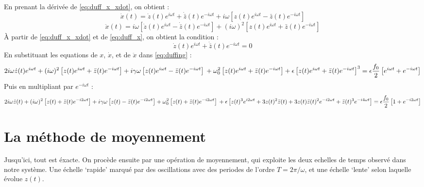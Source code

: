 En prenant la dérivée de \eqref{eq:duff_x_xdot}, on obtient :
\begin{equation}
    \dot{x}(t) = \dot{z}(t)e^{i\omega t} + \dot{\bar{z}}(t) e^{-i\omega t} + i\omega \left[ z(t)e^{i\omega t} - \bar{z}(t) e^{-i\omega t} \right]
    \label{eq:duff_x}
\end{equation}
\begin{equation}
    \ddot{x}(t) = i\omega \left[ \dot{z}(t)e^{i\omega t} - \dot{\bar{z}}(t) e^{-i\omega t} \right] + (i\omega)^2 \left[ z(t)e^{i\omega t} + \bar{z}(t) e^{-i\omega t} \right]
\end{equation}
À partir de \eqref{eq:duff_x_xdot} et de \eqref{eq:duff_x}, on obtient la condition :
\begin{equation}
    \dot{z}(t)e^{i\omega t} + \dot{\bar{z}}(t) e^{-i\omega t} = 0
\end{equation}
%
En substituant les equations de $x$, $\dot{x}$, et de $\ddot{x}$ dans \eqref{eq:duffing} :
%
\begin{dmath}
    2i\omega \dot{z}(t)e^{i\omega t} + (i\omega)^2 \left[ z(t)e^{i\omega t} + \bar{z}(t) e^{-i\omega t} \right]
    + i\gamma\omega \left[ z(t)e^{i\omega t} - \bar{z}(t) e^{-i\omega t} \right] \\
    + \omega_0^2 \left[ z(t)e^{i\omega t} + \bar{z}(t) e^{-i\omega t} \right]
    + \epsilon \left[ z(t)e^{i\omega t} + \bar{z}(t) e^{-i\omega t} \right]^3 = \epsilon \frac{f_0}{2}\left[ e^{i\omega t} + e^{-i\omega t} \right]
\end{dmath}
Puis en multipliant par $e^{-i\omega t}$ :
\begin{dmath}
    2i\omega \dot{z}(t) + (i\omega)^2 \left[ z(t) + \bar{z}(t) e^{-i 2 \omega t} \right]
    + i\gamma\omega \left[ z(t) - \bar{z}(t) e^{-i 2 \omega t} \right]
    + \omega_0^2 \left[ z(t) + \bar{z}(t) e^{-i 2 \omega t} \right] \\
    + \epsilon \left[ z(t)^3 e^{i 2 \omega t} + 3 z(t)^2 \bar{z}(t) + 3z(t)\bar{z}(t)^2 e^{-i2\omega t} + \bar{z}(t)^3 e^{-i4 \omega t} \right]
    = \epsilon \frac{f_0}{2}\left[ 1 + e^{-i 2 \omega t} \right]
    \label{eq:duff_pre_av}
\end{dmath}
%
\section{La méthode de moyennement}
%
Jusqu'ici, tout est éxacte. On procède ensuite par une opération de moyennement, qui exploite les deux echelles de temps observé dans notre système. 
Une échelle `rapide' marqué par des oscillations avec des periodes de l'ordre $T = 2\pi / \omega$, 
et une échelle `lente' selon laquelle évolue $z(t)$. 

